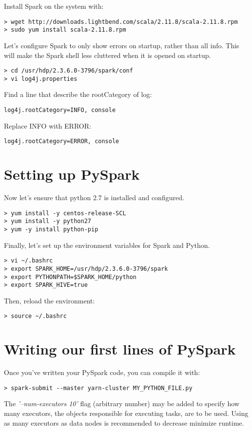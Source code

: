 \documentclass[9pt,twocolumn,twoside]{idsi}
\begin{document}
\noindent
Install Spark on the system with:
\begin{verbatim}
> wget http://downloads.lightbend.com/scala/2.11.8/scala-2.11.8.rpm
> sudo yum install scala-2.11.8.rpm
\end{verbatim}

\noindent
Let's configure Spark to only show errors on startup, rather than all info. This will make the Spark shell less cluttered when it is opened on startup.
\begin{verbatim}
> cd /usr/hdp/2.3.6.0-3796/spark/conf
> vi log4j.properties
\end{verbatim}

\noindent
Find a line that describe the rootCategory of log:
\begin{verbatim}
log4j.rootCategory=INFO, console
\end{verbatim}

Replace INFO with ERROR:
\begin{verbatim}
log4j.rootCategory=ERROR, console
\end{verbatim}

\section{Setting up PySpark}

Now let's ensure that python 2.7 is installed and configured.
\begin{verbatim}
> yum install -y centos-release-SCL
> yum install -y python27
> yum -y install python-pip
\end{verbatim}

\noindent
Finally, let's set up the environment variables for Spark and Python.
\begin{verbatim}
> vi ~/.bashrc
> export SPARK_HOME=/usr/hdp/2.3.6.0-3796/spark
> export PYTHONPATH=$SPARK_HOME/python
> export SPARK_HIVE=true
\end{verbatim}

Then, reload the environment:
\begin{verbatim}
> source ~/.bashrc
\end{verbatim}

\section{Writing our first lines of PySpark}

Once you've written your PySpark code, you can compile it with:
\begin{verbatim}
> spark-submit --master yarn-cluster MY_PYTHON_FILE.py
\end{verbatim}

The \textit{'--num-executors 10'} flag (arbitrary number) may be added to specify how many executors, the objects responsible for executing tasks, are to be used. Using as many executors as data nodes is recommended to decrease minimize runtime.
\end{document}
